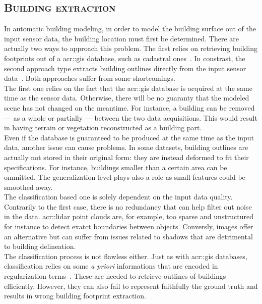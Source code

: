     \subsection{\textsc{Building extraction}}
        \label{subsec::state_of_the_art::building_modeling::building_extraction}
        In automatic building modeling, in order to model the building surface out of the input sensor data, the building location must first be determined.
        There are actually two ways to approach this problem.
        The first relies on retrieving building footprints out of a \gls{acr::gis} database, such as cadastral ones~\parencite{horna2007building,durupt2006automatic,biljecki2017generating,biljecki2019raise,taillandier2004automatic,ledoux2011topologically}.
        In constrast, the second approach type extracts building outlines directly from the input sensor data~\parencite{poullis2009automatic,lafarge2012creating,nguatem2017modeling,zhu2018large}.
        Both approaches suffer from some shortcomings.\\

        The first one relies on the fact that the \gls{acr::gis} database is acquired at the same time as the sensor data.
        Otherwise, there will be no guaranty that the modeled scene has not changed on the meantime.
        For instance, a building can be removed --- as a whole or partially --- between the two data acquisitions.
        This would result in having terrain or vegetation reconstructed as a building part.\\
        Even if the database is guaranteed to be produced at the same time as the input data, another issue can cause problems.
        In some datasets, building outlines are actually not stored in their original form: they are instead deformed to fit their specifications.
        For instance, buildings smaller than a certain area can be ommitted.
        The generalization level plays also a role as small features could be smoothed away.\\
        
        The classification based one is solely dependent on the input data quality.
        Contrarily to the first case, there is no redundancy that can help filter out noise in the data.
        \Gls{acr::lidar} point clouds are, for example, too sparse and unstructured for instance to detect exatct boundaries between objects\addref.
        Conversly, images offer an alternative but can suffer from issues related to shadows that are detrimental to building delineation\addref.\\
        The classification process is not flawless either.
        Just as with \gls{acr::gis} databases, classification relies on some \textit{a priori} informations that are encoded in regularization terms~\parencite{lafarge2008structural,zhu2018large,zeng2018neural}.
        These are needed to retrieve outlines of buildings efficiently.
        However, they can also fail to represent faithfully the ground truth and results in wrong building footprint extraction.

